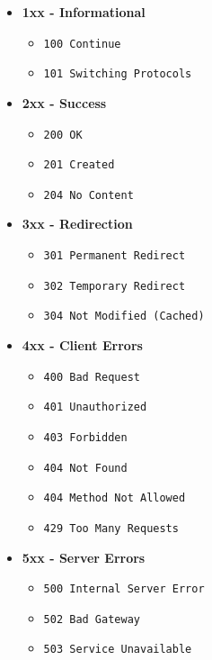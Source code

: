 \documentclass[12pt, letterpaper]{article}
\begin{document}
\begin{itemize}
    \item \textbf{1xx - Informational}
        \begin{itemize}
            \item \texttt{100 Continue}
            \item \texttt{101 Switching Protocols}
        \end{itemize}
    \item \textbf{2xx - Success}
        \begin{itemize}
            \item \texttt{200 OK}
            \item \texttt{201 Created}
            \item \texttt{204 No Content}
        \end{itemize}
    \item \textbf{3xx - Redirection}
        \begin{itemize}
            \item \texttt{301 Permanent Redirect}
            \item \texttt{302 Temporary Redirect}
            \item \texttt{304 Not Modified (Cached)}
        \end{itemize}
    \item \textbf{4xx - Client Errors}
        \begin{itemize}
            \item \texttt{400 Bad Request}
            \item \texttt{401 Unauthorized}
            \item \texttt{403 Forbidden}
            \item \texttt{404 Not Found}
            \item \texttt{404 Method Not Allowed}
            \item \texttt{429 Too Many Requests}
        \end{itemize}
    \item \textbf{5xx - Server Errors}
        \begin{itemize}
            \item \texttt{500 Internal Server Error}
            \item \texttt{502 Bad Gateway}
            \item \texttt{503 Service Unavailable}
        \end{itemize}
\end{itemize}
\end{document}
